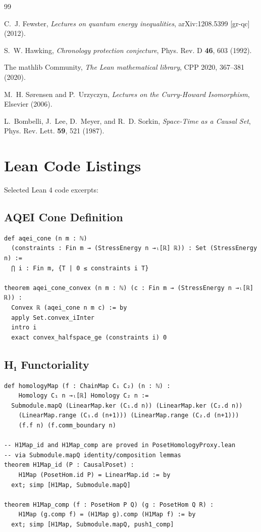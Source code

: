 \documentclass[12pt]{article}
\begin{document}
\begin{thebibliography}{99}

C.~J. Fewster,
\textit{Lectures on quantum energy inequalities},
arXiv:1208.5399 [gr-qc] (2012).

S.~W. Hawking,
\textit{Chronology protection conjecture},
Phys. Rev. D \textbf{46}, 603 (1992).

The mathlib Community,
\textit{The Lean mathematical library},
CPP 2020, 367--381 (2020).

M.~H. S{\o}rensen and P.~Urzyczyn,
\textit{Lectures on the Curry-Howard Isomorphism},
Elsevier (2006).

L.~Bombelli, J.~Lee, D.~Meyer, and R.~D. Sorkin,
\textit{Space-Time as a Causal Set},
Phys. Rev. Lett. \textbf{59}, 521 (1987).

\end{thebibliography}

\appendix

\section{Lean Code Listings}

Selected Lean 4 code excerpts:

\subsection{AQEI Cone Definition}

\begin{verbatim}
def aqei_cone (n m : ℕ) 
  (constraints : Fin m → (StressEnergy n →ₗ[ℝ] ℝ)) : Set (StressEnergy n) :=
  ⋂ i : Fin m, {T | 0 ≤ constraints i T}
  
theorem aqei_cone_convex (n m : ℕ) (c : Fin m → (StressEnergy n →ₗ[ℝ] ℝ)) :
  Convex ℝ (aqei_cone n m c) := by
  apply Set.convex_iInter
  intro i
  exact convex_halfspace_ge (constraints i) 0
\end{verbatim}

\subsection{H₁ Functoriality}

\begin{verbatim}
def homologyMap (f : ChainMap C₁ C₂) (n : ℕ) :
    Homology C₁ n →ₗ[ℝ] Homology C₂ n :=
  Submodule.mapQ (LinearMap.ker (C₁.d n)) (LinearMap.ker (C₂.d n))
    (LinearMap.range (C₁.d (n+1))) (LinearMap.range (C₂.d (n+1)))
    (f.f n) (f.comm_boundary n)

-- H1Map_id and H1Map_comp are proved in PosetHomologyProxy.lean
-- via Submodule.mapQ identity/composition lemmas
theorem H1Map_id (P : CausalPoset) :
    H1Map (PosetHom.id P) = LinearMap.id := by
  ext; simp [H1Map, Submodule.mapQ]

theorem H1Map_comp (f : PosetHom P Q) (g : PosetHom Q R) :
    H1Map (g.comp f) = (H1Map g).comp (H1Map f) := by
  ext; simp [H1Map, Submodule.mapQ, push1_comp]
\end{verbatim}
\end{document}
